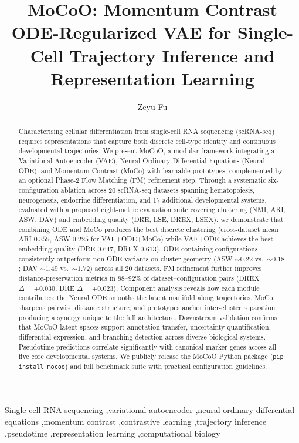 \documentclass[preprint,12pt,number]{elsarticle}
\newcommand{\MoCoO}{\textsc{MoCoO}\xspace}
\begin{document}
\begin{frontmatter}

\title{MoCoO: Momentum Contrast ODE-Regularized VAE for Single-Cell Trajectory Inference and Representation Learning}

\author{Zeyu Fu}
\address{School of Computer Science, University of Birmingham, Birmingham, B15 2TT, UK}

\begin{abstract}
Characterising cellular differentiation from single-cell RNA sequencing (scRNA-seq) requires representations that capture both discrete cell-type identity and continuous developmental trajectories. We present \MoCoO, a modular framework integrating a Variational Autoencoder (VAE), Neural Ordinary Differential Equations (Neural ODE), and Momentum Contrast (MoCo) with learnable prototypes, complemented by an optional Phase-2 Flow Matching (FM) refinement step. Through a systematic six-configuration ablation across 20 scRNA-seq datasets spanning hematopoiesis, neurogenesis, endocrine differentiation, and 17 additional developmental systems, evaluated with a proposed eight-metric evaluation suite covering clustering (NMI, ARI, ASW, DAV) and embedding quality (DRE, LSE, DREX, LSEX), we demonstrate that combining ODE and MoCo produces the best discrete clustering (cross-dataset mean ARI $0.359$, ASW $0.225$ for VAE+ODE+MoCo) while VAE+ODE achieves the best embedding quality (DRE $0.647$, DREX $0.613$). ODE-containing configurations consistently outperform non-ODE variants on cluster geometry (ASW ${\sim}0.22$ vs.\ ${\sim}0.18$; DAV ${\sim}1.49$ vs.\ ${\sim}1.72$) across all 20 datasets. FM refinement further improves distance-preservation metrics in 88--92\% of dataset--configuration pairs (DREX $\Delta{=}+0.030$, DRE $\Delta{=}+0.023$). Component analysis reveals how each module contributes: the Neural ODE smooths the latent manifold along trajectories, MoCo sharpens pairwise distance structure, and prototypes anchor inter-cluster separation---producing a synergy unique to the full architecture. Downstream validation confirms that MoCoO latent spaces support annotation transfer, uncertainty quantification, differential expression, and branching detection across diverse biological systems. Pseudotime predictions correlate significantly with canonical marker genes across all five core developmental systems. We publicly release the MoCoO Python package (\texttt{pip install mocoo}) and full benchmark suite with practical configuration guidelines.
\end{abstract}

\begin{keyword}
Single-cell RNA sequencing \sep variational autoencoder \sep neural ordinary differential equations \sep momentum contrast \sep contrastive learning \sep trajectory inference \sep pseudotime \sep representation learning \sep computational biology
\end{keyword}

\end{frontmatter}
\end{document}
